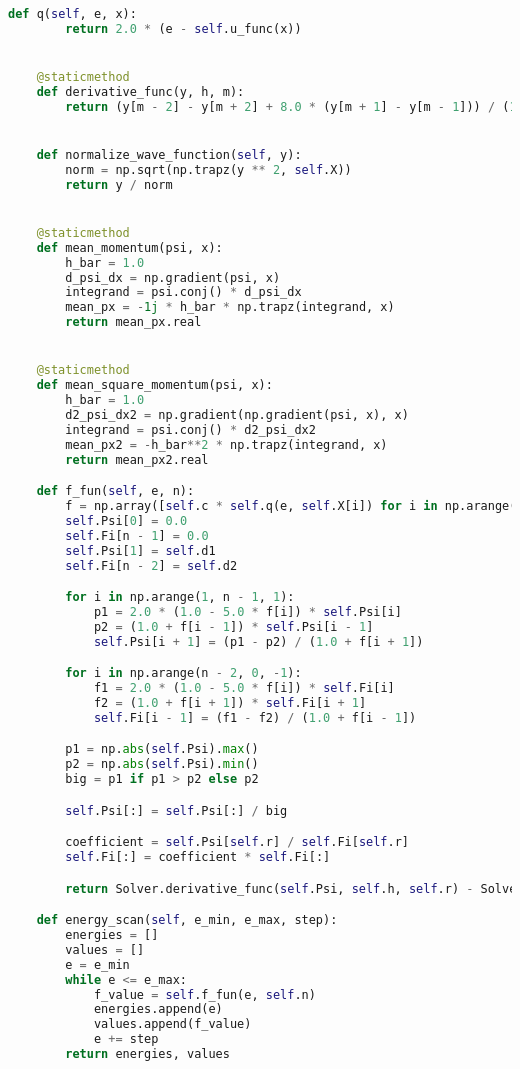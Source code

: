 \begin{lstlisting}[language=Python, caption=Код файла solver.py,label={lst:solver}]
    def q(self, e, x):
        return 2.0 * (e - self.u_func(x))


    @staticmethod
    def derivative_func(y, h, m):
        return (y[m - 2] - y[m + 2] + 8.0 * (y[m + 1] - y[m - 1])) / (12.0 * h)


    def normalize_wave_function(self, y):
        norm = np.sqrt(np.trapz(y ** 2, self.X))
        return y / norm


    @staticmethod
    def mean_momentum(psi, x):
        h_bar = 1.0
        d_psi_dx = np.gradient(psi, x)
        integrand = psi.conj() * d_psi_dx
        mean_px = -1j * h_bar * np.trapz(integrand, x)
        return mean_px.real


    @staticmethod
    def mean_square_momentum(psi, x):
        h_bar = 1.0
        d2_psi_dx2 = np.gradient(np.gradient(psi, x), x)
        integrand = psi.conj() * d2_psi_dx2
        mean_px2 = -h_bar**2 * np.trapz(integrand, x)
        return mean_px2.real

    def f_fun(self, e, n):
        f = np.array([self.c * self.q(e, self.X[i]) for i in np.arange(n)])
        self.Psi[0] = 0.0
        self.Fi[n - 1] = 0.0
        self.Psi[1] = self.d1
        self.Fi[n - 2] = self.d2

        for i in np.arange(1, n - 1, 1):
            p1 = 2.0 * (1.0 - 5.0 * f[i]) * self.Psi[i]
            p2 = (1.0 + f[i - 1]) * self.Psi[i - 1]
            self.Psi[i + 1] = (p1 - p2) / (1.0 + f[i + 1])

        for i in np.arange(n - 2, 0, -1):
            f1 = 2.0 * (1.0 - 5.0 * f[i]) * self.Fi[i]
            f2 = (1.0 + f[i + 1]) * self.Fi[i + 1]
            self.Fi[i - 1] = (f1 - f2) / (1.0 + f[i - 1])

        p1 = np.abs(self.Psi).max()
        p2 = np.abs(self.Psi).min()
        big = p1 if p1 > p2 else p2

        self.Psi[:] = self.Psi[:] / big

        coefficient = self.Psi[self.r] / self.Fi[self.r]
        self.Fi[:] = coefficient * self.Fi[:]

        return Solver.derivative_func(self.Psi, self.h, self.r) - Solver.derivative_func(self.Fi, self.h, self.r)

    def energy_scan(self, e_min, e_max, step):
        energies = []
        values = []
        e = e_min
        while e <= e_max:
            f_value = self.f_fun(e, self.n)
            energies.append(e)
            values.append(f_value)
            e += step
        return energies, values


\end{lstlisting}
